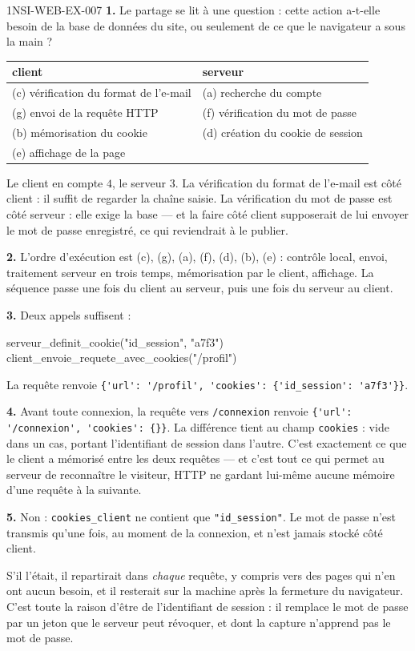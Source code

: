 \begin{corrige}{1NSI-WEB-EX-007}
\textbf{1.} Le partage se lit à une question : cette action a-t-elle besoin de
la base de données du site, ou seulement de ce que le navigateur a sous la main ?

\begin{center}
\begin{tabular}{ll}
\hline
client & serveur \\
\hline
(c) vérification du format de l'e-mail & (a) recherche du compte \\
(g) envoi de la requête HTTP & (f) vérification du mot de passe \\
(b) mémorisation du cookie & (d) création du cookie de session \\
(e) affichage de la page & \\
\hline
\end{tabular}
\end{center}

Le client en compte $4$, le serveur $3$. La vérification du format de l'e-mail
est côté client : il suffit de regarder la chaîne saisie. La vérification du mot
de passe est côté serveur : elle exige la base — et la faire côté client
supposerait de lui envoyer le mot de passe enregistré, ce qui reviendrait à le
publier.

\textbf{2.} L'ordre d'exécution est
(c), (g), (a), (f), (d), (b), (e) : contrôle local, envoi, traitement serveur en
trois temps, mémorisation par le client, affichage. La séquence passe une fois
du client au serveur, puis une fois du serveur au client.

\textbf{3.} Deux appels suffisent :
\begin{python}
serveur_definit_cookie("id_session", "a7f3")
client_envoie_requete_avec_cookies("/profil")
\end{python}
La requête renvoie
\lstinline!{'url': '/profil', 'cookies': {'id_session': 'a7f3'}}!.

\textbf{4.} Avant toute connexion, la requête vers \lstinline{/connexion} renvoie
\lstinline!{'url': '/connexion', 'cookies': {}}!. La différence tient au champ
\lstinline{cookies} : vide dans un cas, portant l'identifiant de session dans
l'autre. C'est exactement ce que le client a mémorisé entre les deux requêtes —
et c'est tout ce qui permet au serveur de reconnaître le visiteur, HTTP ne
gardant lui-même aucune mémoire d'une requête à la suivante.

\textbf{5.} Non : \lstinline{cookies_client} ne contient que
\lstinline{"id_session"}. Le mot de passe n'est transmis qu'une fois, au moment
de la connexion, et n'est jamais stocké côté client.

S'il l'était, il repartirait dans \emph{chaque} requête, y compris vers des pages
qui n'en ont aucun besoin, et il resterait sur la machine après la fermeture du
navigateur. C'est toute la raison d'être de l'identifiant de session : il
remplace le mot de passe par un jeton que le serveur peut révoquer, et dont la
capture n'apprend pas le mot de passe.
\end{corrige}
